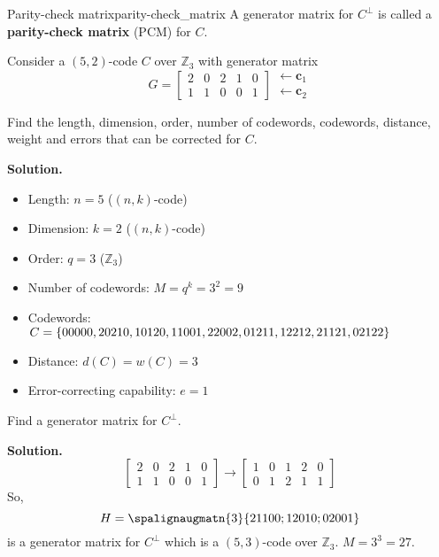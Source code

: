\begin{Definition}{Parity-check matrix}{parity-check_matrix}
    A generator matrix for $ C^{\perp} $ is called a \textbf{parity-check matrix}
    (PCM) for $ C $.
\end{Definition}

\begin{Example}{}{}
    Consider a $ (5,2) $-code $ C $ over $ \mathbb{Z}_3 $ with generator matrix
    \[ G=
        \begin{bmatrix}
            2 & 0 & 2 & 1 & 0 \\
            1 & 1 & 0 & 0 & 1
        \end{bmatrix}
        \begin{matrix}
            \leftarrow \symbf{c}_1 \\
            \leftarrow \symbf{c}_2
        \end{matrix} \]

    Find the length, dimension, order, number of codewords, codewords,
    distance, weight and errors that can be corrected for $ C $.

    \textbf{Solution.}
    \begin{itemize}
        \item Length: $ n=5 $ ($ (n,k) $-code)
        \item Dimension: $ k=2 $ ($ (n,k) $-code)
        \item Order: $ q=3 $ ($ \mathbb{Z}_3 $)
        \item Number of codewords: $ M=q^k=3^2=9 $
        \item Codewords: $ C=\{00000,20210,10120,11001,22002,01211,12212,21121,02122\} $
        \item Distance: $ d(C)=w(C)=3 $
        \item Error-correcting capability: $ e=1 $
    \end{itemize}

    Find a generator matrix for $ C^{\perp} $.

    \textbf{Solution.}
    \[\begin{bmatrix}
            2 & 0 & 2 & 1 & 0 \\
            1 & 1 & 0 & 0 & 1
        \end{bmatrix}\rightarrow
        \begin{bmatrix}
            1 & 0 & 1 & 2 & 0 \\
            0 & 1 & 2 & 1 & 1
        \end{bmatrix}\]
    So,
    \[ H=
        \spalignaugmatn{3}{
            2 1 1 0 0;
            1 2 0 1 0;
            0 2 0 0 1
        }
    \]
    is a generator matrix for $ C^{\perp} $ which is a $ (5,3) $-code
    over $ \mathbb{Z}_3 $. $ M=3^3=27 $.
\end{Example}

